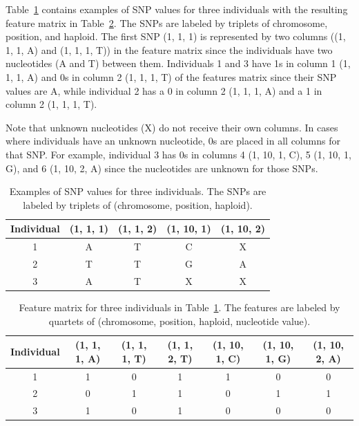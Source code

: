 Table~\ref{tab:snp-examples} contains examples of SNP values for three individuals with the resulting feature matrix in Table~\ref{tab:features-example}.  The SNPs are labeled by triplets of chromosome, position, and haploid.  The first SNP (1, 1, 1) is represented by two columns ((1, 1, 1, A) and (1, 1, 1, T)) in the feature matrix since the individuals have two nucleotides (A and T) between them. Individuals 1 and 3 have 1s in column 1 (1, 1, 1, A) and 0s in column 2 (1, 1, 1, T) of the features matrix since their SNP values are A, while individual 2 has a 0 in column 2 (1, 1, 1, A) and a 1 in column 2 (1, 1, 1, T).

Note that unknown nucleotides (X) do not receive their own columns.  In cases where individuals have an unknown nucleotide, 0s are placed in all columns for that SNP.  For example, individual 3 has 0s in columns 4 (1, 10, 1, C), 5 (1, 10, 1, G), and 6 (1, 10, 2, A) since the nucleotides are unknown for those SNPs.

\begin{table}[h!]
  \begin{center}
    \begin{tabular}{ c c c c c }
      \hline
      \textbf{Individual} & \textbf{(1, 1, 1)} & \textbf{(1, 1, 2)} & \textbf{(1, 10, 1)} & \textbf{(1, 10, 2)} \\ \hline
      1 & A & T & C & X \\
      2 & T & T & G & A \\
      3 & A & T & X & X \\
    \end{tabular}
  \end{center}
  \caption{Examples of SNP values for three individuals.  The SNPs are labeled by triplets of (chromosome, position, haploid).}
  \label{tab:snp-examples}
\end{table}

\begin{table}[h!]
  \begin{center}
    \begin{tabular}{ c c c c c c c}
      \hline
      \textbf{Individual} & \textbf{(1, 1, 1, A)} & \textbf{(1, 1, 1, T)} &\textbf{(1, 1, 2, T)} & \textbf{(1, 10, 1, C)} & \textbf{(1, 10, 1, G)} &\textbf{(1, 10, 2, A)} \\ \hline
      1 & 1 & 0 & 1 & 1 & 0 & 0 \\
      2 & 0 & 1 & 1 & 0 & 1 & 1 \\
      3 & 1 & 0 & 1 & 0 & 0 & 0 \\
    \end{tabular}
  \end{center}
  \caption{Feature matrix for three individuals in Table~\ref{tab:snp-examples}.  The features are labeled by quartets of (chromosome, position, haploid, nucleotide value).}
  \label{tab:features-example}
\end{table}

